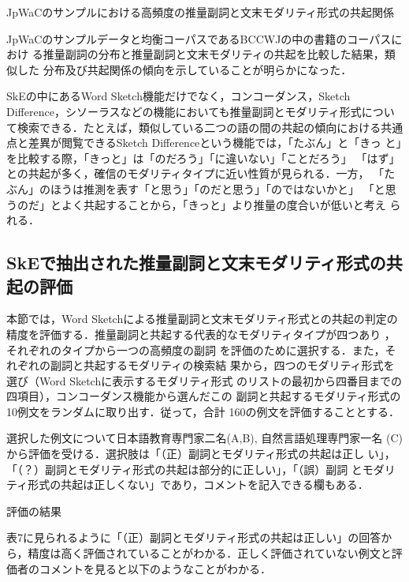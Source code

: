 \documentclass[japanese]{jnlp_1.4}
\begin{document}
\begin{table}[t]
\caption{JpWaCのサンプルにおける高頻度の推量副詞と文末モダリティ形式の共起関係}

\end{table}


JpWaCのサンプルデータと均衡コーパスであるBCCWJの中の書籍のコーパスにおけ
る推量副詞の分布と推量副詞と文末モダリティの共起を比較した結果，類似した
分布及び共起関係の傾向を示していることが明らかになった\cite{Srdanovic2009}．


SkEの中にあるWord Sketch機能だけでなく，コンコーダンス，Sketch
Difference，シソーラスなどの機能においても推量副詞とモダリティ形式につい
て検索できる．たとえば，類似している二つの語の間の共起の傾向における共通
点と差異が閲覧できるSketch Differenceという機能では，「たぶん」と「きっ
と」を比較する際，「きっと」は「のだろう」「に違いない」「ことだろう」
「はず」との共起が多く，確信のモダリティタイプに近い性質が見られる．一方，
「たぶん」のほうは推測を表す「と思う」「のだと思う」「のではないかと」
「と思うのだ」とよく共起することから，「きっと」より推量の度合いが低いと考え
られる．


\subsection{SkEで抽出された推量副詞と文末モダリティ形式の共起の評価}

本節では，Word Sketchによる推量副詞と文末モダリティ形式との共起の判定の
精度を評価する．推量副詞と共起する代表的なモダリティタイプが四つあり
\cite{Kudou,Srdanovic2008a}，それぞれのタイプから一つの高頻度の副詞
を評価のために選択する．また，それぞれの副詞と共起するモダリティの検索結
果から，四つのモダリティ形式を選び（Word Sketchに表示するモダリティ形式
のリストの最初から四番目までの四項目），コンコーダンス機能から選んだこの
副詞と共起するモダリティ形式の10例文をランダムに取り出す．従って，合計
160の例文を評価することとする．

選択した例文について日本語教育専門家二名(A,B), 自然言語処理専門家一名
(C)から評価を受ける．選択肢は「（正）副詞とモダリティ形式の共起は正し
い」，「（？）副詞とモダリティ形式の共起は部分的に正しい」，「（誤）副詞
とモダリティ形式の共起は正しくない」であり，コメントを記入できる欄もある．

\begin{table}[t]
\caption{評価の結果}

\end{table}

表7に見られるように「（正）副詞とモダリティ形式の共起は正しい」の回答か
ら，精度は高く評価されていることがわかる．正しく評価されていない例文と評
価者のコメントを見ると以下のようなことがわかる．
\end{document}
